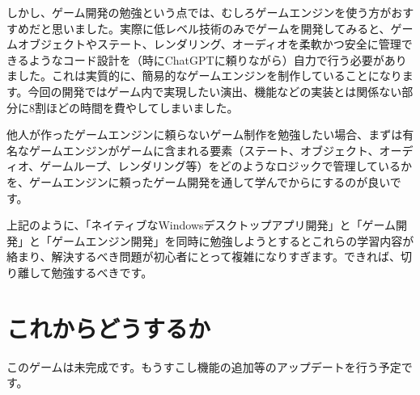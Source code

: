 \documentclass[a4paper,11pt]{jsarticle}
\theoremstyle{definition}
\begin{document}
しかし、ゲーム開発の勉強という点では、むしろゲームエンジンを使う方がおすすめだと思いました。実際に低レベル技術のみでゲームを開発してみると、ゲームオブジェクトやステート、レンダリング、オーディオを柔軟かつ安全に管理できるようなコード設計を（時にChatGPTに頼りながら）自力で行う必要がありました。これは実質的に、簡易的なゲームエンジンを制作していることになります。今回の開発ではゲーム内で実現したい演出、機能などの実装とは関係ない部分に8割ほどの時間を費やしてしまいました。

他人が作ったゲームエンジンに頼らないゲーム制作を勉強したい場合、まずは有名なゲームエンジンがゲームに含まれる要素（ステート、オブジェクト、オーディオ、ゲームループ、レンダリング等）をどのようなロジックで管理しているかを、ゲームエンジンに頼ったゲーム開発を通して学んでからにするのが良いです。


上記のように、「ネイティブなWindowsデスクトップアプリ開発」と「ゲーム開発」と「ゲームエンジン開発」を同時に勉強しようとするとこれらの学習内容が絡まり、解決するべき問題が初心者にとって複雑になりすぎます。できれば、切り離して勉強するべきです。

\section{これからどうするか}

このゲームは未完成です。もうすこし機能の追加等のアップデートを行う予定です。




\end{document}
